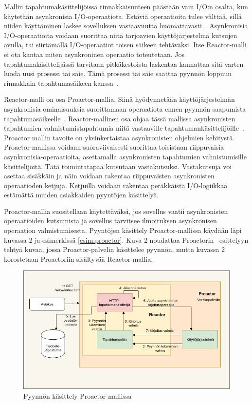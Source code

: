 \documentclass[finnish]{tktltiki2}
\theoremstyle{definition}
\theoremstyle{remark}
\begin{document}
Mallin tapahtumakäsittelijöissä rinnakkaisuuteen päästään
vain I/O:n osalta, kun käytetään asynkronisia
I/O-operaatiota.
Estäviä operaatioita tulee välttää,
sillä niiden käyttäminen laskee sovelluksen
vastaavuutta huomattavasti~\cite{schmidt_reactor:_1995}.
Asynkronisia I/O-operaatioita
voidaan suorittaa niitä tarjoavien käyttöjärjestelmä kutsujen
avulla, tai siirtämällä I/O-operaatiot toisen säikeen tehtäväksi.
Itse Reactor-malli ei ota kantaa miten asynkroninen operaatio toteutetaan.
Jos tapahtumakäsittelijässä tarvitaan pitkäkestoista laskentaa
kannattaa sitä varten luoda uusi prosessi tai säie. Tämä
prosessi tai säie saattaa pyynnön loppuun rinnakkain
tapahtumasäikeen kanssa~\cite{schmidt_reactor:_1995}.

Reactor-malli on osa Proactor-mallia.
Siinä hyödynnetään käyttöjärjestelmän asynkronisia ominaisuuksia suorittamaan
operaatiota ennen pyynnön saapumista tapahtumasäikeelle~\cite{pyarali_proactor_1997}.
Reactor-mallinen osa ohjaa tässä mallissa asynkronisten tapahtumien
valmistumistapahtumia niitä vastaaville tapahtumankäsittelijöille~\cite{pyarali_proactor_1997}.
Proactor mallin tavoite on yksinkertaistaa asynkronisten ohjelmien kehitystä.
Proactor-mallissa voidaan suoraviivaisesti suorittaa toisistaan riippuvaisia
asynkronisia-operaatioita, asettamalla asynkronisten tapahtumien valmistumisille
käsittelijöitä.
Tätä toimintatapaa kutsutaan vastakutsuksi. 
Vastakutsuja voi asettaa sisäkkäin ja näin voidaan rakentaa riippuvaisten
asynkronisten operaatioden ketjuja. Ketjuilla voidaan
rakentaa peräkkäistä I/O-logiikkaa estämättä muiden asiakkaiden
pyyntöjen käsittelyä.

Proactor-mallia suositellaan käytettäväksi, jos sovellus vaatii
asynkronisten operaatioiden kutsumista ja sovellus tarvitsee ilmoituksen
asynkronisen operaation valmistumisesta.
Pyyntöjen käsittely Proactor-mallissa käydään läpi kuvassa 2 ja
esimerkissä \autoref{esim:proactor}.
Kuva 2 noudattaa Proactorin~\cite{pyarali_proactor_1997} esittelyyn tehtyä
kuvaa, jossa Proactor-palvelin käsittelee pyynnön, mutta kuvassa 2 
korostetaan Proactoriin-sisältyvää Reactor-mallia.
\begin{figure}
    \caption{Pyynnön käsittely Proactor-mallissa~\cite{pyarali_proactor_1997}}
\includegraphics[scale=0.5]{Proactor.png}
\end{figure}
\end{document}
